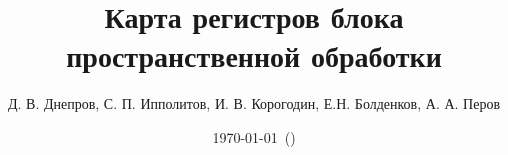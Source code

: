 


\title{Карта регистров блока пространственной обработки}
\author{Д. В. Днепров, С. П. Ипполитов, И. В. Корогодин, Е.Н. Болденков, А. А. Перов}
\confidential{}
\date{\today~(\currenttime)}
\renewcommand{\familydefault}{\sfdefault}





\maketitle

\newpage
\tableofcontents
\newpage











